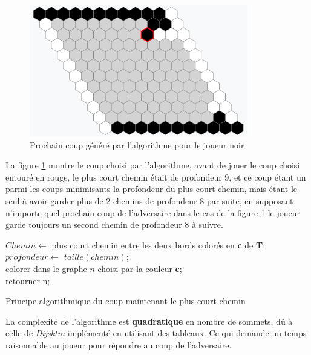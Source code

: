 \begin{figure}[h]
    \centering
    \label{fig:Hexmove}
    \includegraphics[width=0.85\textwidth]{Images/Hex_move_shortest.png}

    \caption{Prochain coup généré par l'algorithme pour le joueur noir}
\end{figure}

La figure \ref{fig:Hexmove} montre le coup choisi par l'algorithme, avant de jouer le coup choisi entouré en rouge, le plus court chemin était de profondeur 9, et ce coup étant un parmi les coups minimisants la profondeur du plus court chemin, mais étant le seul à avoir garder plus de 2 chemins de profondeur 8 par suite, en supposant n'importe quel prochain coup de l'adversaire dans le cas de la figure \ref{fig:Hexmove} le joueur garde toujours un second chemin de profondeur 8 à suivre.\\

\begin{algorithm}[H]

$Chemin \leftarrow$ plus court chemin entre les deux bords colorés en \textbf{c} de \textbf{T};\\
$profondeur \leftarrow$ $taille(chemin)$; \\    
colorer dans le graphe $n$ choisi par la couleur \textbf{c};\\
retourner n;

\caption{Principe algorithmique du coup maintenant le plus court chemin}
\label{algoShortPath}
\end{algorithm}
La complexité de l'algorithme est \textbf{quadratique} en nombre de sommets, dû à celle de \textit{Dijsktra} implémenté en utilisant des tableaux. Ce qui demande un temps raisonnable au joueur pour répondre au coup de l'adversaire.

